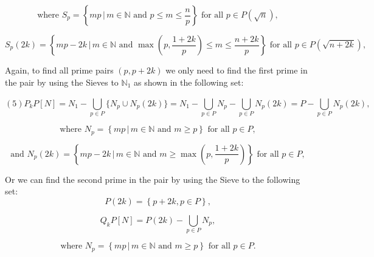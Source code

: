 \documentclass{aomart}
\begin{document}
\begin{equation}
\text{where } S_{p} = \left\{ mp \, | \, m \in \mathbb{N} \text{ and } p \leq m \leq \frac{n}{p} \right\} \text{ for all } p \in P(\sqrt{n}),
\end{equation}

\begin{equation}
S_{p}(2k) = \left\{ mp-2k \, | \, m \in \mathbb{N} \text{ and } \max\left( p, \frac{1+2k}{p} \right) \leq m \leq \frac{n+2k}{p} \right\} \text{ for all } p \in P(\sqrt{n+2k}),
\end{equation}

\vspace{1\baselineskip}

Again, to find all prime pairs \( (p, p+2k) \) we only need to find the first prime in the pair by using the Sieves to \(\mathbb{N}_1\) as shown in the following set:


\begin{equation}
\left(5\right)         P_{k}P\left[N\right] = N_{1}-\bigcup_{p\in P}^{}\{  N_{p}\cup N_{p}(2k)\}  =  N_{1} - \bigcup_{p\in P}^{} N_{p}- \bigcup_{p\in P}^{} N_{p}(2k) = P- \bigcup_{p\in P}^{} N_{p}(2k), 
\end{equation}


\begin{equation}
\text{where } N_{p} = \left\{ mp \, | \, m \in \mathbb{N} \text{ and } m \geq p \right\} \text{ for all } p \in P,
\end{equation}


\begin{equation}
\text{and } N_{p}(2k) = \left\{ mp-2k \, | \, m \in \mathbb{N} \text{ and } m \geq \max\left( p, \frac{1+2k}{p} \right) \right\} \text{ for all } p \in P,
\end{equation}

\begin{center}
Or we can find the second prime in the pair by using  the Sieve to the following set:\textbf{\textit{ \\ }}\begin{equation}
P(2k) =\left\{  p+2k,  p\in P\right\}  ,
\end{equation}


\begin{equation}
Q_{k}P[N] = P(2k) - \bigcup_{p \in P} N_{p},
\end{equation}

\begin{equation}
\text{where } N_{p} = \left\{ mp \, | \, m \in \mathbb{N} \text{ and } m \geq p \right\} \text{ for all } p \in P.
\end{equation}
\end{center}
\end{document}
